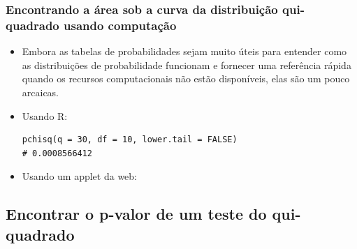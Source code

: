 \begin{frame}[fragile]
\frametitle{Encontrando a área sob a curva da distribuição qui-quadrado usando computação}

\begin{itemize}
\justifying
\item Embora as tabelas de probabilidades sejam muito úteis para entender como as distribuições de probabilidade funcionam e fornecer uma referência rápida quando os recursos computacionais não estão disponíveis, elas são um pouco arcaicas.

\pause

\item Usando R:
{\footnotesize
\begin{lstlisting}
pchisq(q = 30, df = 10, lower.tail = FALSE)
# 0.0008566412
\end{lstlisting}
}

\pause

\item Usando um applet da web:


\end{itemize}

\end{frame}


\subsection{Encontrar o p-valor de um teste do qui-quadrado}


